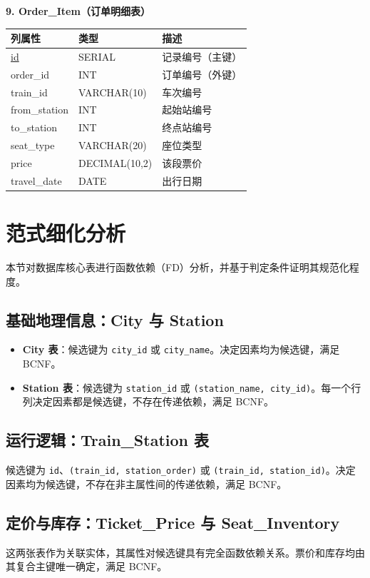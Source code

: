 \documentclass[10pt,a4paper]{article}
\begin{document}
\textbf{9. Order\_Item（订单明细表）}
\begin{table}[H]
    \centering
    \begin{tabular}{lll}
        \toprule
        \textbf{列属性} & \textbf{类型} & \textbf{描述} \\
        \midrule
        \underline{id} & SERIAL & 记录编号（主键） \\
        order\_id & INT & 订单编号（外键） \\
        train\_id & VARCHAR(10) & 车次编号 \\
        from\_station & INT & 起始站编号 \\
        to\_station & INT & 终点站编号 \\
        seat\_type & VARCHAR(20) & 座位类型 \\
        price & DECIMAL(10,2) & 该段票价 \\
        travel\_date & DATE & 出行日期 \\
        \bottomrule
    \end{tabular}
\end{table}

\section{范式细化分析}
本节对数据库核心表进行函数依赖（FD）分析，并基于判定条件证明其规范化程度。

\subsection{基础地理信息：City 与 Station}
\begin{itemize}
    \item \textbf{City 表}：候选键为 \texttt{city\_id} 或 \texttt{city\_name}。决定因素均为候选键，满足 BCNF。
    \item \textbf{Station 表}：候选键为 \texttt{station\_id} 或 \texttt{(station\_name, city\_id)}。每一个行列决定因素都是候选键，不存在传递依赖，满足 BCNF。
\end{itemize}

\subsection{运行逻辑：Train\_Station 表}
候选键为 \texttt{id}、\texttt{(train\_id, station\_order)} 或 \texttt{(train\_id, station\_id)}。决定因素均为候选键，不存在非主属性间的传递依赖，满足 BCNF。

\subsection{定价与库存：Ticket\_Price 与 Seat\_Inventory}
这两张表作为关联实体，其属性对候选键具有完全函数依赖关系。票价和库存均由其复合主键唯一确定，满足 BCNF。
\end{document}
